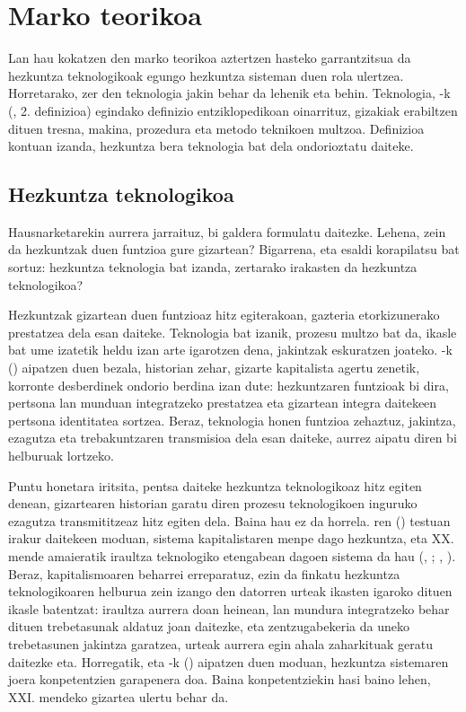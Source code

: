 \chapter{Marko teorikoa}\label{cha:markoa}
Lan hau kokatzen den marko teorikoa aztertzen hasteko garrantzitsua da hezkuntza teknologikoak egungo hezkuntza sisteman duen rola ulertzea. Horretarako, zer den teknologia jakin behar da lehenik eta behin. Teknologia, \citeauthor{harluxet2019awareness}-k (\citeyear{harluxet2019awareness}, 2. definizioa) egindako definizio entziklopedikoan oinarrituz, gizakiak erabiltzen dituen tresna, makina, prozedura eta metodo teknikoen multzoa. Definizioa kontuan izanda, hezkuntza bera teknologia bat dela ondorioztatu daiteke.

\section{Hezkuntza teknologikoa}\label{sec:heztek}

Hausnarketarekin aurrera jarraituz, bi galdera formulatu daitezke. Lehena, zein da hezkuntzak duen funtzioa gure gizartean? Bigarrena, eta esaldi korapilatsu bat sortuz: hezkuntza teknologia bat izanda, zertarako irakasten da hezkuntza teknologikoa?

Hezkuntzak gizartean duen funtzioaz hitz egiterakoan, gazteria etorkizunerako prestatzea dela esan daiteke. Teknologia bat izanik, prozesu multzo bat da, ikasle bat ume izatetik heldu izan arte igarotzen dena, jakintzak eskuratzen joateko. \citeauthor{tarabini2020que}-k (\citeyear{tarabini2020que}) aipatzen duen bezala, historian zehar, gizarte kapitalista agertu zenetik, korronte desberdinek ondorio berdina izan dute: hezkuntzaren funtzioak bi dira, pertsona lan munduan integratzeko prestatzea eta gizartean integra daitekeen pertsona identitatea sortzea. Beraz, teknologia honen funtzioa zehaztuz, jakintza, ezagutza eta trebakuntzaren transmisioa dela esan daiteke, aurrez aipatu diren bi helburuak lortzeko.

Puntu honetara iritsita, pentsa daiteke hezkuntza teknologikoaz hitz egiten denean, gizartearen historian garatu diren prozesu teknologikoen inguruko ezagutza transmititzeaz hitz egiten dela. Baina hau ez da horrela. \citeauthor{tarabini2020que}ren (\citeyear{tarabini2020que}) testuan irakur daitekeen moduan, sistema kapitalistaren menpe dago hezkuntza, eta XX. mende amaieratik iraultza teknologiko etengabean dagoen sistema da hau (\citeauthor{del2016industria}, \citeyear{del2016industria}; \citeauthor{ghobakhloo2020industry}, \citeyear{ghobakhloo2020industry}). Beraz, kapitalismoaren beharrei erreparatuz, ezin da finkatu hezkuntza teknologikoaren helburua zein izango den datorren urteak ikasten igaroko dituen ikasle batentzat: iraultza aurrera doan heinean, lan mundura integratzeko behar dituen trebetasunak aldatuz joan daitezke, eta zentzugabekeria da uneko trebetasunen jakintza garatzea, urteak aurrera egin ahala zaharkituak geratu daitezke eta. Horregatik, eta \citeauthor{sole2020cambio}-k (\citeyear{sole2020cambio}) aipatzen duen moduan, hezkuntza sistemaren joera konpetentzien garapenera doa. Baina konpetentziekin hasi baino lehen, XXI. mendeko gizartea ulertu behar da.

